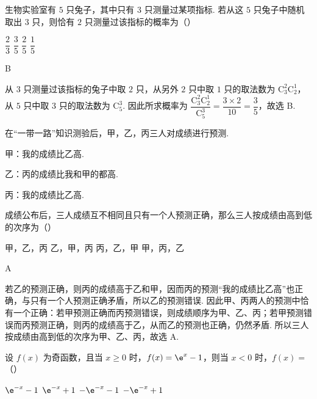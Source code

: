 \begin{problem}
生物实验室有 \(5\) 只兔子，其中只有 \(3\) 只测量过某项指标. 若从这 \(5\) 只兔子中随机取出 \(3\) 只，则恰有 \(2\) 只测量过该指标的概率为（\quad）

\choices
    {\(\dfrac23\)}
    {\(\dfrac35\)}
    {\(\dfrac25\)}
    {\(\dfrac15\)}
\end{problem}

\begin{answer}
B
\end{answer}

\begin{solution}
从 \(3\) 只测量过该指标的兔子中取 \(2\) 只，从另外 \(2\) 只中取 \(1\) 只的取法数为 \(\mathrm C_3^2\mathrm C_2^1\)，从 \(5\) 只中取 \(3\) 只的取法数为 \(\mathrm C_5^3\). 因此所求概率为 \(\dfrac{\mathrm C_3^2\mathrm C_2^1}{\mathrm C_5^3}=\dfrac{3\times2}{10}=\dfrac35\)，故选 B.
\end{solution}

\begin{problem}
在“一带一路”知识测验后，甲，乙，丙三人对成绩进行预测.

甲：我的成绩比乙高.

乙：丙的成绩比我和甲的都高.

丙：我的成绩比乙高.

成绩公布后，三人成绩互不相同且只有一个人预测正确，那么三人按成绩由高到低的次序为（\quad）

\choices
    {甲，乙，丙}
    {乙，甲，丙}
    {丙，乙，甲}
    {甲，丙，乙}
\end{problem}

\begin{answer}
A
\end{answer}

\begin{solution}
若乙的预测正确，则丙的成绩高于乙和甲，因而丙的预测“我的成绩比乙高”也正确，与只有一个人预测正确矛盾，所以乙的预测错误. 因此甲、丙两人的预测中恰有一个正确：若甲预测正确而丙预测错误，则成绩顺序为甲、乙、丙；若甲预测错误而丙预测正确，则丙的成绩高于乙，从而乙的预测也正确，仍然矛盾. 所以三人按成绩由高到低的次序为甲、乙、丙，故选 A.
\end{solution}

\begin{problem}
设 \(f(x)\) 为奇函数，且当 \(x\ge0\) 时，\(f(x)=\e^x-1\)，则当 \(x<0\) 时，\(f(x)=\)（\quad）

\choices
    {\(\e^{-x}-1\)}
    {\(\e^{-x}+1\)}
    {\(-\e^{-x}-1\)}
    {\(-\e^{-x}+1\)}
\end{problem}

